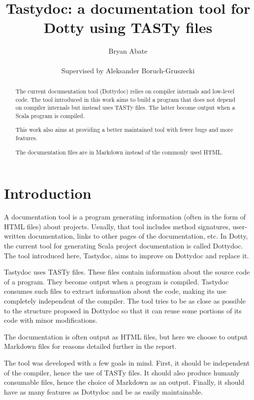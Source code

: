\documentclass{report}
\begin{document}
\title{Tastydoc: a documentation tool for Dotty using TASTy files}
\author{Bryan Abate
\\\\\small{Supervised by Aleksander Boruch-Gruszecki}}

\maketitle

\begin{abstract}
The current documentation tool (Dottydoc) relies on compiler internals and low-level code. The tool introduced in this work aims to build a program that does not depend on compiler internals but instead uses TASTy files. The latter become output when a Scala program is compiled.

This work also aims at providing a better maintained tool with fewer bugs and more features.

The documentation files are in Markdown instead of the commonly used HTML.
\end{abstract}

\tableofcontents

\chapter{Introduction}

A documentation tool is a program generating information (often in the form of HTML files) about projects. Usually, that tool includes method signatures, user-written documentation, links to other pages of the documentation, etc.
In Dotty, the current tool for generating Scala project documentation is called Dottydoc. The tool introduced here, Tastydoc, aims to improve on Dottydoc and replace it.

Tastydoc uses TASTy files. These files contain information about the source code of a program. They become output when a program is compiled. Tastydoc consumes such files to extract information about the code, making its use completely independent of the compiler.
The tool tries to be as close as possible to the structure proposed in Dottydoc so that it can reuse some portions of its code with minor modifications.

The documentation is often output as HTML files, but here we choose to output Markdown files for reasons detailed further in the report.

The tool was developed with a few goals in mind. First, it should be independent of the compiler, hence the use of TASTy files. It should also produce humanly consumable files, hence the choice of Markdown as an output. Finally, it should have as many features as Dottydoc and be as easily maintainable.
\end{document}

